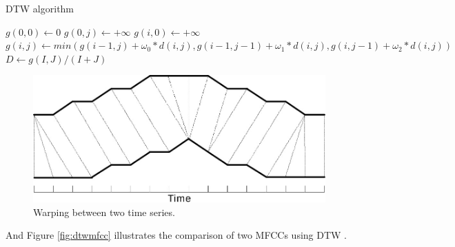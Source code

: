 \documentclass[%
  article,%
  10pt,%
  a4paper,%
  fleqn,%
  oneside,%
  sumario = tradicional,%
  chapter = TITLE,%
  section = TITLE,%
]{abntex2}
\begin{document}
\begin{algorithm}
  \caption{DTW algorithm}\label{euclid}
  \begin{algorithmic}
    \State $g(0, 0) \gets 0$
    \State $g(0, j) \gets +\infty$
    \EndFor
    \State $g(i, 0) \gets +\infty$
    \State $g(i, j) \gets min(g(i - 1, j) + \omega_{0} * d(i, j), g(i - 1, j - 1) + \omega_{1} * d(i, j), g(i, j - 1) + \omega_{2} * d(i, j))$
    \EndFor
    \EndFor
    \State $D \gets g(I, J) / (I + J)$
  \end{algorithmic}
\end{algorithm}
\begin{figure}[H]
  \centering
   \includegraphics[width = 0.5\columnwidth]{./Figuras/dtw_1}
  \caption[Warping between two time series]{Warping between two time series\footnotemark.}
  \label{fig:dtw_1}
\end{figure}

And Figure \ref{fig:dtwmfcc} illustrates the comparison of two MFCCs using DTW \cite{1163055}.
\end{document}
